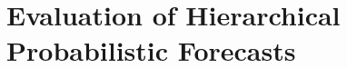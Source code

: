 \documentclass[12pt]{article}
\theoremstyle{definition}
\begin{document}
%
%
%

\section{Evaluation of Hierarchical Probabilistic Forecasts} \label{sec:evaluation}
\end{document}

